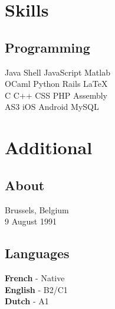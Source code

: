 \documentclass[letterpaper]{deedy-resume} %
\begin{document}
\begin{minipage}[t]{0.33\textwidth}
\sectionspace %


\section{Skills}

\subsection{Programming}

Java \textbullet{} Shell \textbullet{} JavaScript \textbullet{} Matlab \\
OCaml \textbullet{} Python \textbullet{} Rails \textbullet{} \LaTeX\ \\ 
C \textbullet{} C++ \textbullet{} CSS \textbullet{} PHP \textbullet{} Assembly \\
AS3 \textbullet{} iOS \textbullet{} Android \textbullet{} MySQL

\sectionspace %


\section{Additional}

\subsection{About}

Brussels, Belgium \\
9 August 1991 

\sectionspace %


\subsection{Languages}

\textbf{French} - Native \\
\textbf{English} - B2/C1 \\
\textbf{Dutch} - A1

\sectionspace %


\end{minipage} %
\end{document}
